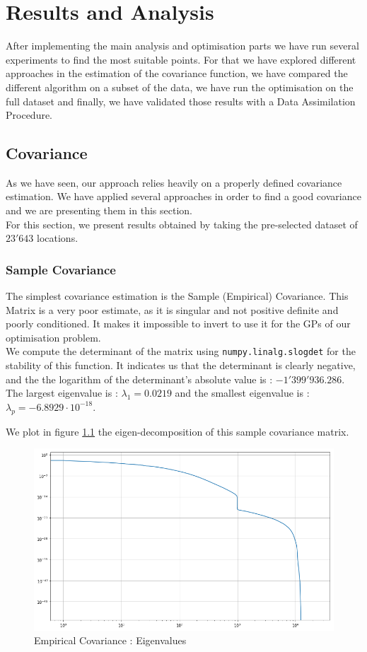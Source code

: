 \chapter{Results and Analysis} \label{chap:results}
After implementing the main analysis and optimisation parts we have run several experiments to find the most suitable points. For that we have explored different approaches in the estimation of the covariance function, we have compared the different algorithm on a subset of the data, we have run the optimisation on the full dataset and finally, we have validated those results with a Data Assimilation Procedure. 


\section{Covariance}

As we have seen, our approach relies heavily on a properly defined covariance estimation. We have applied several approaches in order to find a good covariance and we are presenting them in this section. \\

For this section, we present results obtained by taking the pre-selected dataset of $23'643$ locations. 

\subsection{Sample Covariance}

The simplest covariance estimation is the Sample (Empirical) Covariance. This Matrix is a very poor estimate, as it is singular and not positive definite and poorly conditioned. It makes it impossible to invert to use it for the GPs of our optimisation problem. \\ 

We compute the determinant of the matrix using \texttt{numpy.linalg.slogdet} for the stability of this function. It indicates us that the determinant is clearly negative, and the the logarithm of the determinant's absolute value is : $-1'399'936.286$. The largest eigenvalue is : $\lambda_1 = 0.0219$ and the smallest eigenvalue is : $\lambda_p = -6.8929 \cdot 10^{-18}$.

We plot in figure \ref{fig:cov:emp:eigs} the eigen-decomposition of this sample covariance matrix.

\begin{figure}[h!]
\centering
    \includegraphics[width=0.7\linewidth]{figures/Covariance/Tracer_23643/cov_emp_eigenval_loglog}
    \caption{Empirical Covariance : Eigenvalues}
    \label{fig:cov:emp:eigs}
\end{figure}

